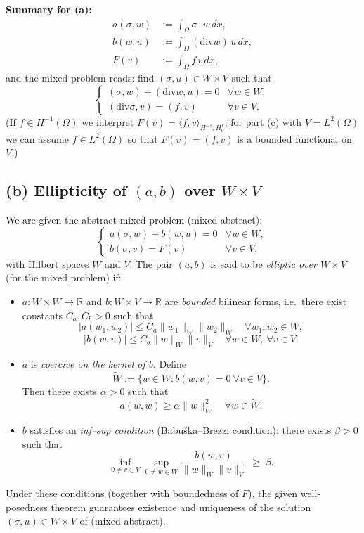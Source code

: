\textbf{Summary for (a):}
\[
    \boxed{
        \begin{aligned}
            a(\sigma,w) & := \int_\Omega \sigma\cdot w\,dx, \\
            b(w,u)      & := \int_\Omega (\mathrm{div} w)\,u\,dx,   \\
            F(v)        & := \int_\Omega f\,v\,dx,
        \end{aligned}}
\]
and the mixed problem reads: find $(\sigma,u)\in W\times V$ such that
\[
    \begin{cases}
        (\sigma,w) + (\mathrm{div} w, u) = 0 & \forall w \in W, \\
        (\mathrm{div}\sigma, v) = (f,v)      & \forall v \in V.
    \end{cases}
\]
(If $f\in H^{-1}(\Omega)$ we interpret $F(v) = \langle f,v\rangle_{H^{-1},H_0^1}$;
for part (c) with $V=L^2(\Omega)$ we can assume $f\in L^2(\Omega)$ so that
$F(v)=(f,v)$ is a bounded functional on $V$.)
\subsection*{(b) Ellipticity of $(a,b)$ over $W\times V$}
We are given the abstract mixed problem (mixed-abstract):
\[
    \begin{cases}
        a(\sigma,w) + b(w,u) = 0 & \forall w\in W, \\
        b(\sigma,v) = F(v)       & \forall v\in V,
    \end{cases}
\]
with Hilbert spaces $W$ and $V$.
The pair $(a,b)$ is said to be \emph{elliptic over $W\times V$} (for the mixed problem) if:
\begin{itemize}
    \item $a : W\times W \to \mathbb{R}$ and $b : W\times V \to \mathbb{R}$ are
          \emph{bounded} bilinear forms, i.e.\ there exist constants $C_a,C_b>0$ such that
          \[
              |a(w_1,w_2)| \le C_a \|w_1\|_W \|w_2\|_W
              \quad\forall w_1,w_2\in W,
          \]
          \[
              |b(w,v)| \le C_b \|w\|_W \|v\|_V
              \quad\forall w\in W,\ \forall v\in V.
          \]
    \item $a$ is \emph{coercive on the kernel of $b$}.
          Define
          \[
              \widetilde W
              := \{ w\in W : b(w,v) = 0 \ \forall v\in V\}.
          \]
          Then there exists $\alpha>0$ such that
          \[
              a(w,w) \ge \alpha \|w\|_W^2
              \quad\forall w\in \widetilde W.
          \]
    \item $b$ satisfies an \emph{inf--sup condition} (Babu\v ska--Brezzi condition):
          there exists $\beta>0$ such that
          \[
              \inf_{0\neq v\in V}
              \sup_{0\neq w\in W}
              \frac{b(w,v)}{\|w\|_W \|v\|_V}
              \;\ge\; \beta.
          \]
\end{itemize}
Under these conditions (together with boundedness of $F$), the given well-posedness theorem
guarantees existence and uniqueness of the solution $(\sigma,u)\in W\times V$ of (mixed-abstract).
